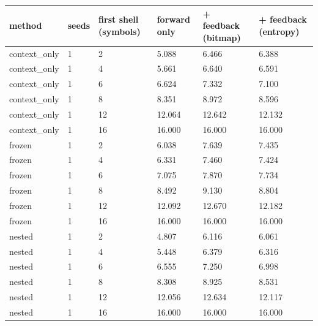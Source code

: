 \begin{tabular}{llllll}
\hline
method & seeds & first shell (symbols) & forward only & + feedback (bitmap) & + feedback (entropy) \\
\hline
context\_only & 1 & 2 & 5.088 & 6.466 & 6.388 \\
context\_only & 1 & 4 & 5.661 & 6.640 & 6.591 \\
context\_only & 1 & 6 & 6.624 & 7.332 & 7.100 \\
context\_only & 1 & 8 & 8.351 & 8.972 & 8.596 \\
context\_only & 1 & 12 & 12.064 & 12.642 & 12.132 \\
context\_only & 1 & 16 & 16.000 & 16.000 & 16.000 \\
frozen & 1 & 2 & 6.038 & 7.639 & 7.435 \\
frozen & 1 & 4 & 6.331 & 7.460 & 7.424 \\
frozen & 1 & 6 & 7.075 & 7.870 & 7.734 \\
frozen & 1 & 8 & 8.492 & 9.130 & 8.804 \\
frozen & 1 & 12 & 12.092 & 12.670 & 12.182 \\
frozen & 1 & 16 & 16.000 & 16.000 & 16.000 \\
nested & 1 & 2 & 4.807 & 6.116 & 6.061 \\
nested & 1 & 4 & 5.448 & 6.379 & 6.316 \\
nested & 1 & 6 & 6.555 & 7.250 & 6.998 \\
nested & 1 & 8 & 8.308 & 8.925 & 8.531 \\
nested & 1 & 12 & 12.056 & 12.634 & 12.117 \\
nested & 1 & 16 & 16.000 & 16.000 & 16.000 \\
\hline
\end{tabular}
